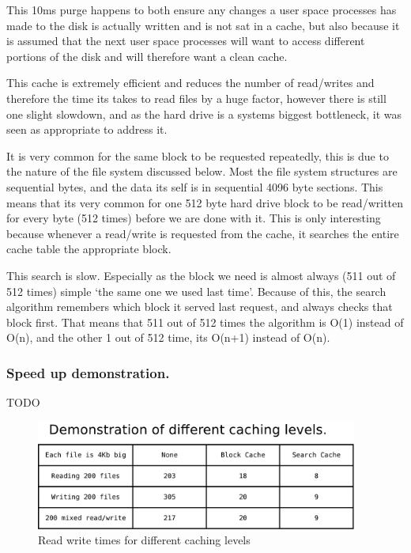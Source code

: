 \documentclass[a4paper]{report}
\begin{document}
This 10ms purge happens to both ensure any changes a user space processes has made to the disk is actually written and is not sat in a cache, but also because it is assumed that the next user space processes will want to access different portions of the disk and will therefore want a clean cache.

This cache is extremely efficient and reduces the number of read/writes and therefore the time its takes to read files by a huge factor, however there is still one slight slowdown, and as the hard drive is a systems biggest bottleneck, it was seen as appropriate to address it.

It is very common for the same block to be requested repeatedly, this is due to the nature of the file system discussed below. Most the file system structures are sequential bytes, and the data its self is in sequential 4096 byte sections. This means that its very common for one 512 byte hard drive block to be read/written for every byte (512 times) before we are done with it. This is only interesting because whenever a read/write is requested from the cache, it searches the entire cache table the appropriate block.

This search is slow. Especially as the block we need is almost always (511 out of 512 times) simple `the same one we used last time'. Because of this, the search algorithm remembers which block it served last request, and always checks that block first. That means that 511 out of 512 times the algorithm is O(1) instead of O(n), and the other 1 out of 512 time, its O(n+1) instead of O(n).

\subsubsection{Speed up demonstration.}

TODO


\begin{figure}[ht]
\centering
\includegraphics[width=400px]{images/Caching_Speedup}
\caption{Read write times for different caching levels}
\label{fig:WinTitleBarScreen}
\end{figure}
\end{document}
